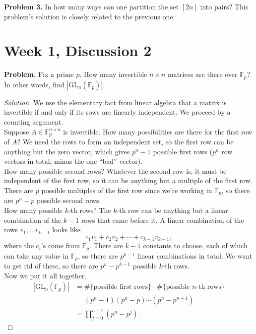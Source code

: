 \documentclass[11pt,letterpaper]{report}
\newcommand{\field}{\mathbb{F}}
\theoremstyle{definition}
\theoremstyle{remark}
\newenvironment{solution}
{\begin{proof}[Solution]}
{\end{proof}}
\begin{document}
\noindent\textbf{Problem 3. }In how many ways can one partition the set $[2n]$ into pairs? This problem's solution is closely related to the previous one.

\section{Week 1, Discussion 2}
\newcommand{\GL}{\text{GL}}
\newcommand{\SL}{\text{SL}}
\noindent\textbf{Problem. }Fix a prime $p$. How many invertible $n\times n$ matrices are there over $\field_p$? In other words, find $|\GL_n(\field_p)|$.
\begin{solution}
	We use the elementary fact from linear algebra that a matrix is invertible if and only if its rows are linearly independent. We proceed by a counting argument.\\

	\noindent Suppose $A\in \field_p^{n\times n}$ is invertible. How many possibilities are there for the first row of $A$? We need the rows to form an independent set, so the first row can be anything but the zero vector, which gives $p^n - 1$ possible first rows ($p^n$ row vectors in total, minus the one ``bad'' vector).\\

	\noindent How many possible second rows? Whatever the second row is, it must be independent of the first row, so it can be anything but a multiple of the first row. There are $p$ possible multiples of the first row since we're working in $\field_p$, so there are $p^n - p$ possible second rows.\\

	\noindent How many possible $k$-th rows? The $k$-th row can be anything but a linear combination of the $k-1$ rows that came before it. A linear combination of the rows $v_1, \ldots v_{k-1}$ looks like
	\[
	c_1v_1 + c_2v_2 + \cdots +c_{k-1}v_{k-1},
	\]
	where the $c_i$'s come from $\field_p$. There are $k-1$ constants to choose, each of which can take any value in $\field_p$, so there are $p^{k-1}$ linear combinations in total. We want to get rid of these, so there are $p^n - p^{k-1}$ possible $k$-th rows.\\

	\noindent Now we put it all together.
	\begin{align*}
	|\GL_n(\field_p)| &= \#\{\text{possible first rows}\} \cdots \#\{\text{possible $n$-th rows}\}\\
	&= (p^n-1)(p^n-p)\cdots (p^n-p^{n-1})\\
	&= \prod_{j=0}^{n-1}(p^n-p^j).
	\end{align*}


\end{solution}
\end{document}
